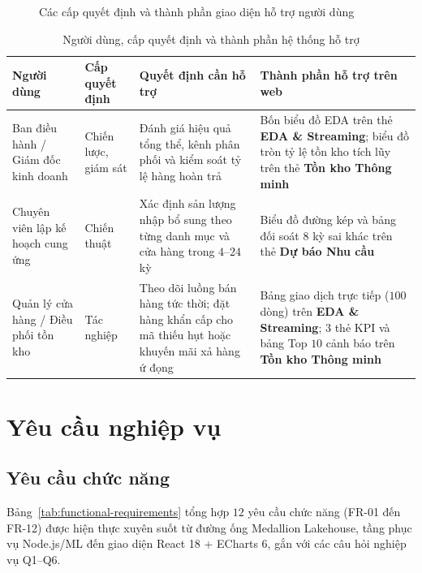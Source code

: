 \begin{figure}[H]
	\centering
	\caption{Các cấp quyết định và thành phần giao diện hỗ trợ người dùng}
	\label{fig:decision_levels}
\end{figure}

\begin{table}[H]
	\centering
	\footnotesize
	\begin{tabular}{p{2.6cm} p{1.9cm} p{4.6cm} p{5.1cm}}
		\toprule
		\textbf{Người dùng}                  & \textbf{Cấp quyết định} & \textbf{Quyết định cần hỗ trợ}                                                                      & \textbf{Thành phần hỗ trợ trên web}                                                                                                          \\
		\midrule
		Ban điều hành / Giám đốc kinh doanh  & Chiến lược, giám sát    & Đánh giá hiệu quả tổng thể, kênh phân phối và kiểm soát tỷ lệ hàng hoàn trả                         & Bốn biểu đồ EDA trên thẻ \textbf{EDA \& Streaming}; biểu đồ tròn tỷ lệ tồn kho tích lũy trên thẻ \textbf{Tồn kho Thông minh}                 \\
		\midrule
		Chuyên viên lập kế hoạch cung ứng    & Chiến thuật             & Xác định sản lượng nhập bổ sung theo từng danh mục và cửa hàng trong $4$--$24$ kỳ                   & Biểu đồ đường kép và bảng đối soát $8$ kỳ sai khác trên thẻ \textbf{Dự báo Nhu cầu}                                                          \\
		\midrule
		Quản lý cửa hàng / Điều phối tồn kho & Tác nghiệp              & Theo dõi luồng bán hàng tức thời; đặt hàng khẩn cấp cho mã thiếu hụt hoặc khuyến mãi xả hàng ứ đọng & Bảng giao dịch trực tiếp ($100$ dòng) trên \textbf{EDA \& Streaming}; $3$ thẻ KPI và bảng Top $10$ cảnh báo trên \textbf{Tồn kho Thông minh} \\
		\bottomrule
	\end{tabular}
	\caption{Người dùng, cấp quyết định và thành phần hệ thống hỗ trợ}
	\label{tab:user-decision-levels}
\end{table}

\section{Yêu cầu nghiệp vụ}
\label{sec:requirements}

\subsection{Yêu cầu chức năng}
\label{sec:functional-requirements}
Bảng~\ref{tab:functional-requirements} tổng hợp $12$ yêu cầu chức năng (FR-01 đến FR-12) được hiện thực xuyên suốt từ đường ống Medallion Lakehouse, tầng phục vụ Node.js/ML đến giao diện React 18 + ECharts 6, gắn với các câu hỏi nghiệp vụ Q1--Q6.

